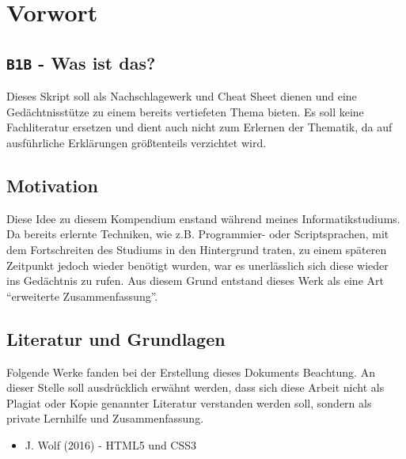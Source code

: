 \chapter{Vorwort}
\section{\texttt{B1B} - Was ist das?}
Dieses Skript soll als Nachschlagewerk und Cheat Sheet dienen und eine Gedächtnisstütze zu einem bereits vertiefeten Thema bieten. Es soll keine Fachliteratur ersetzen und dient auch nicht zum Erlernen der Thematik, da auf ausführliche Erklärungen größtenteils verzichtet wird.
\section{Motivation}
Diese Idee zu diesem Kompendium enstand während meines Informatikstudiums. Da bereits erlernte Techniken, wie z.B. Programmier- oder Scriptsprachen, mit dem Fortschreiten des Studiums in den Hintergrund traten, zu einem späteren Zeitpunkt jedoch wieder benötigt wurden, war es unerlässlich sich diese wieder ins Gedächtnis zu rufen. Aus diesem Grund entstand dieses Werk als eine Art ``erweiterte Zusammenfassung''.
\section{Literatur und Grundlagen}
Folgende Werke fanden bei der Erstellung dieses Dokuments Beachtung. An dieser Stelle soll ausdrücklich erwähnt werden, dass sich diese Arbeit nicht als Plagiat oder Kopie genannter Literatur verstanden werden soll, sondern als private Lernhilfe und Zusammenfassung.
\begin{itemize}
\item J. Wolf (2016) - HTML5 und CSS3
\end{itemize}
